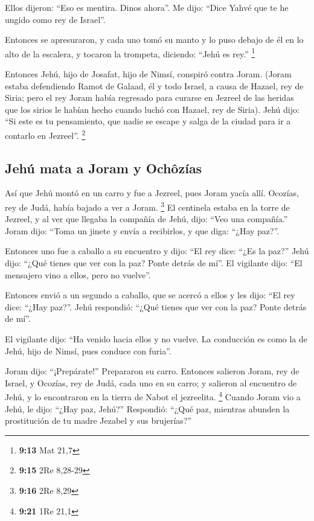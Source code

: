  Ellos dijeron: ``Eso es mentira. Dinos ahora''. Me dijo:
``Dice Yahvé que te he ungido como rey de Israel''.

 Entonces se apresuraron, y cada uno tomó su manto y lo
puso debajo de él en lo alto de la escalera, y tocaron la trompeta,
diciendo: ``Jehú es rey.'' \footnote{\textbf{9:13} Mat 21,7}

 Entonces Jehú, hijo de Josafat, hijo de Nimsí, conspiró
contra Joram. (Joram estaba defendiendo Ramot de Galaad, él y todo
Israel, a causa de Hazael, rey de Siria;  pero el rey
Joram había regresado para curarse en Jezreel de las heridas que los
sirios le habían hecho cuando luchó con Hazael, rey de Siria). Jehú
dijo: ``Si este es tu pensamiento, que nadie se escape y salga de la
ciudad para ir a contarlo en Jezreel''. \footnote{\textbf{9:15} 2Re
  8,28-29}

\hypertarget{jehuxfa-mata-a-joram-y-ochuxf4zuxedas}{%
\subsection{Jehú mata a Joram y
Ochôzías}\label{jehuxfa-mata-a-joram-y-ochuxf4zuxedas}}

 Así que Jehú montó en un carro y fue a Jezreel, pues
Joram yacía allí. Ocozías, rey de Judá, había bajado a ver a Joram.
\footnote{\textbf{9:16} 2Re 8,29}  El centinela estaba en
la torre de Jezreel, y al ver que llegaba la compañía de Jehú, dijo:
``Veo una compañía.'' Joram dijo: ``Toma un jinete y envía a recibirlos,
y que diga: ``¿Hay paz?''.

 Entonces uno fue a caballo a su encuentro y dijo: ``El
rey dice: ``¿Es la paz?'' Jehú dijo: ``¿Qué tienes que ver con la paz?
Ponte detrás de mí''. El vigilante dijo: ``El mensajero vino a ellos,
pero no vuelve''.

 Entonces envió a un segundo a caballo, que se acercó a
ellos y les dijo: ``El rey dice: ``¿Hay paz?''. Jehú respondió: ``¿Qué
tienes que ver con la paz? Ponte detrás de mí''.

 El vigilante dijo: ``Ha venido hacia ellos y no vuelve.
La conducción es como la de Jehú, hijo de Nimsí, pues conduce con
furia''.

 Joram dijo: ``¡Prepárate!'' Prepararon su carro.
Entonces salieron Joram, rey de Israel, y Ocozías, rey de Judá, cada uno
en su carro; y salieron al encuentro de Jehú, y lo encontraron en la
tierra de Nabot el jezreelita. \footnote{\textbf{9:21} 1Re 21,1}
 Cuando Joram vio a Jehú, le dijo: ``¿Hay paz, Jehú?''
Respondió: ``¿Qué paz, mientras abunden la prostitución de tu madre
Jezabel y sus brujerías?''

